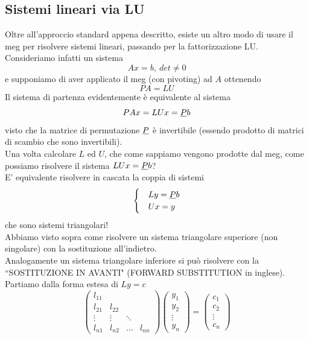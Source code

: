 \documentclass[12pt,a4paper]{article}
\begin{document}
\subsection{Sistemi lineari via LU}
Oltre all'approccio standard appena descritto, esiste un altro modo di usare il meg per risolvere sistemi lineari, passando per la fattorizzazione LU. \\
Consideriamo infatti un sistema
\begin{equation*}
    Ax=b, \ det \neq 0
\end{equation*}
e supponiamo di aver applicato il meg (con pivoting) ad $A$ ottenendo
\begin{equation*}
    PA = LU
\end{equation*}
Il sistema di partenza evidentemente è equivalente al sistema
\begin{equation*}
    PAx=LUx=\uline{P}b
\end{equation*}
visto che la matrice di permutazione $\uline{P}$ è invertibile (essendo prodotto di matrici di scambio che sono invertibili). \\
Una volta calcolare $L$ ed $U$, che come sappiamo vengono prodotte dal meg, come possiamo risolvere il sistema $LUx=\uline{P}b$?\\
E' equivalente risolvere in cascata la coppia di sistemi
\begin{equation*}
    \begin{cases}
         & Ly = \uline{P}b \\
         & Ux = y
    \end{cases}
\end{equation*}
che sono sistemi triangolari! \\
Abbiamo visto sopra come risolvere un sistema triangolare superiore (non singolare) con la sostituzione all'indietro. \\
Analogamente un sistema triangolare inferiore si può risolvere con la ``SOSTITUZIONE IN AVANTI" (FORWARD SUBSTITUTION in inglese). \\
Partiamo dalla forma estesa di $Ly = c$
\begin{equation*}
    \begin{pmatrix}
        l_{11} & & & \\
        l_{21} & l_{22} & & \\
        \vdots & \vdots & \ddots & \\
        l_{n1} & l_{n2} & \dots & l_{nn} 
    \end{pmatrix}
    \begin{pmatrix}
        y_1\\
        y_2 \\
        \vdots \\
        y_n 
    \end{pmatrix} = 
    \begin{pmatrix}
        c_1\\
        c_2 \\
        \vdots \\
        c_n 
    \end{pmatrix}
\end{equation*}
\end{document}
